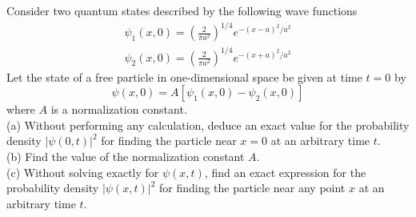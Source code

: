 \documentclass[12pt]{article}
\newenvironment{problem}[2][Problem]{\begin{trivlist}
\item[\hskip \labelsep {\bfseries #1}\hskip \labelsep {\bfseries #2.}]}{\end{trivlist}}
\begin{document}
\begin{problem}{5}
Consider two quantum states described by the following wave functions
\begin{gather*}
\psi_1(x,0)=(\frac{2}{\pi a^2})^{1/4}e^{-(x-a)^2/a^2}\\
\psi_2(x,0)=(\frac{2}{\pi a^2})^{1/4}e^{-(x+a)^2/a^2}
\end{gather*}
Let the state of a free particle in one-dimensional space be given at time $t=0$ by
\[
\psi(x,0)=A[\psi_1(x,0)-\psi_2(x,0)]
\]
where $A$ is a normalization constant.\\
(a) Without performing any calculation, deduce an exact value for the probability density $|\psi(0,t)|^2$ for finding the particle near $x=0$ at an arbitrary time $t$.\\
(b) Find the value of the normalization constant $A$.\\
(c) Without solving exactly for $\psi(x,t)$, find an exact expression for the probability density $|\psi(x,t)|^2$ for finding the particle near any point $x$ at an arbitrary time $t$.
\end{problem}
\end{document}
